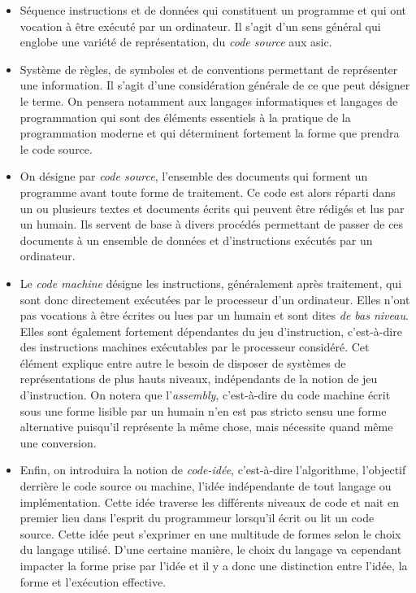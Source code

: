 \documentclass[12pt]{article} %
\begin{document}
\begin{itemize}
    \item Séquence instructions et de données qui constituent un programme et qui ont vocation à être exécuté par un ordinateur. Il s'agit d'un sens général qui englobe une variété de représentation, du \textit{code source} aux \acrfull{asic}.
    \item Système de règles, de symboles et de conventions permettant de représenter une information. Il s'agit d'une considération générale de ce que peut désigner le terme. On pensera notamment aux langages informatiques et langages de programmation qui sont des éléments essentiels à la pratique de la programmation moderne et qui déterminent fortement la forme que prendra le code source.
    \item On désigne par \textit{code source}, l'ensemble des documents qui forment un programme avant toute forme de traitement. Ce code est alors réparti dans un ou plusieurs textes et documents écrits qui peuvent être rédigés et lus par un humain. Ils servent de base à divers procédés permettant de passer de ces documents à un ensemble de données et d'instructions exécutés par un ordinateur. 
    \item Le \textit{code machine} désigne les instructions, généralement après traitement, qui sont donc directement exécutées par le processeur d'un ordinateur. Elles n'ont pas vocations à être écrites ou lues par un humain et sont dites \textit{de bas niveau}. Elles sont également fortement dépendantes du jeu d'instruction, c'est-à-dire des instructions machines exécutables par le processeur considéré. Cet élément explique entre autre le besoin de disposer de systèmes de représentations de plus hauts niveaux, indépendants de la notion de jeu d'instruction. On notera que l'\textit{assembly}, c'est-à-dire du code machine écrit sous une forme lisible par un humain n'en est pas stricto sensu une forme alternative puisqu'il représente la même chose, mais nécessite quand même une conversion.
    \item Enfin, on introduira la notion de \textit{code-idée}, c'est-à-dire l'algorithme, l'objectif derrière le code source ou machine, l'idée indépendante de tout langage ou implémentation. Cette idée traverse les différents niveaux de code et nait en premier lieu dans l'esprit du programmeur lorsqu'il écrit ou lit un code source. Cette idée peut s'exprimer en une multitude de formes selon le choix du langage utilisé. D'une certaine manière, le choix du langage va cependant impacter la forme prise par l'idée et il y a donc une distinction entre l'idée, la forme et l'exécution effective.
\end{itemize}
\end{document}
